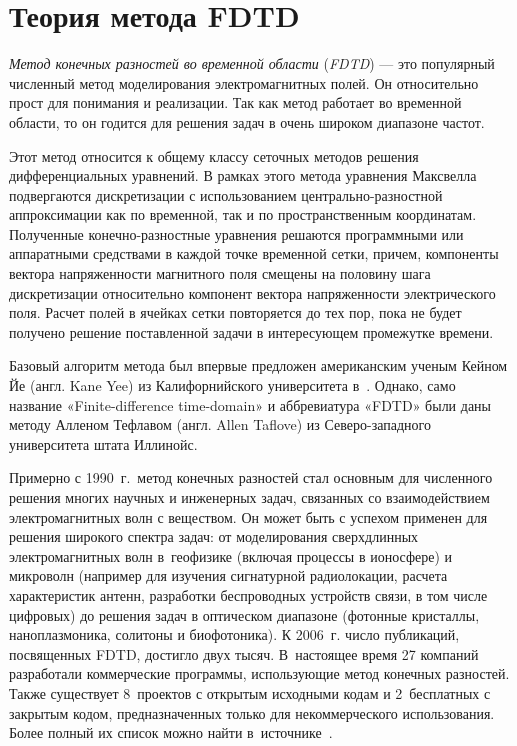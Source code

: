 \section{Теория метода FDTD}
\label{section:CoreMethod}

\emph{Метод конечных разностей во временной области} (\emph{FDTD}) --- это
популярный численный метод моделирования электромагнитных полей. Он относительно
прост для понимания и реализации. Так как метод работает во временной области,
то он годится для решения задач в очень широком диапазоне частот.

Этот метод относится к общему классу сеточных методов решения дифференциальных
уравнений. В рамках этого метода уравнения Максвелла подвергаются дискретизации
с использованием центрально-разностной аппроксимации как по временной, так и по
пространственным координатам. Полученные конечно-разностные уравнения решаются
программными или аппаратными средствами в каждой точке временной сетки, причем,
компоненты вектора напряженности магнитного поля смещены на половину шага
дискретизации относительно компонент вектора напряженности электрического поля.
Расчет полей в ячейках сетки повторяется до тех пор, пока не будет получено
решение поставленной задачи в интересующем промежутке времени.

Базовый алгоритм метода был впервые предложен американским ученым Кейном Йе
(англ. Kane Yee) из Калифорнийского университета в~\cite{bib:Yee1966}. Однако,
само название «Finite-difference time-domain» и аббревиатура «FDTD» были даны
методу Алленом Тефлавом (англ. Allen Taflove) из Северо-западного университета
штата Иллинойс.

Примерно с 1990~г.\ метод конечных разностей стал основным для численного
решения многих научных и инженерных задач, связанных со взаимодействием
электромагнитных волн с веществом. Он может быть с успехом применен для решения
широкого спектра задач: от моделирования сверхдлинных электромагнитных волн
в~геофизике (включая процессы в ионосфере) и микроволн (например для изучения
сигнатурной радиолокации, расчета характеристик антенн, разработки беспроводных
устройств связи, в том числе цифровых) до решения задач в оптическом диапазоне
(фотонные кристаллы, наноплазмоника, солитоны и биофотоника). К 2006~г. число
публикаций, посвященных FDTD, достигло двух тысяч. В~настоящее
время 27 компаний разработали коммерческие программы, использующие метод
конечных разностей. Также существует 8~проектов с открытым исходными кодам
и 2~бесплатных с закрытым кодом, предназначенных только для некоммерческого
использования.
Более полный их список можно найти в~источнике~\cite{bib:WikipediaFdtdArticle}.


